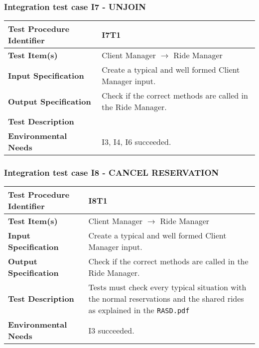 \subsubsection{Integration test case I7 - UNJOIN  }
 \begin{tabular}{l p{}}
    \hline
    \textbf{Test Procedure Identifier} & I7T1  \\
    \hline
    \textbf{Test Item(s)} & Client Manager  $\rightarrow$ Ride Manager \\
    \hline
    \textbf{Input Specification} &  Create a typical and well formed Client Manager input. \\
    \hline
    \textbf{Output Specification} & Check if the correct methods are called in the Ride Manager. \\
    \hline
    \textbf{Test Description} & \\
    \hline
    \textbf{Environmental Needs} &  I3, I4, I6 succeeded.\\
    \hline
    \end{tabular}
\hfill \newline \newline  
\subsubsection{Integration test case I8 - CANCEL RESERVATION }
 \begin{tabular}{l p{}}
    \hline
    \textbf{Test Procedure Identifier} & I8T1 \\
    \hline
    \textbf{Test Item(s)} & Client Manager  $\rightarrow$ Ride Manager \\
    \hline
    \textbf{Input Specification} &  Create a typical and well formed Client Manager input. \\
    \hline
    \textbf{Output Specification} & Check if the correct methods are called in the Ride Manager. \\
    \hline
    \textbf{Test Description} & Tests must check every typical situation with the normal reservations and the shared rides as explained in the \texttt{RASD.pdf}  \\
    \hline
    \textbf{Environmental Needs} & I3 succeeded. \\
    \hline
\end{tabular}
\hfill \newline \newline  
